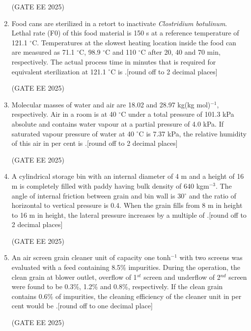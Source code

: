\documentclass[journal,12pt,onecolumn]{IEEEtran}
\theoremstyle{remark}
\begin{document}
\begin{enumerate}
\hfill(GATE EE 2025)

\item Food cans are sterilized in a retort to inactivate \textit{Clostridium botulinum}. Lethal rate (F$0$) of this food material is 150 s at a reference temperature of 121.1 $^\circ$C. Temperatures at the slowest heating location inside the food can are measured as 71.1 $^\circ$C, 98.9 $^\circ$C and 110 $^\circ$C after 20, 40 and 70 min, respectively. The actual process time in minutes that is required for equivalent sterilization at 121.1 $^\circ$C is \underline{\hspace{2cm}}.{[round off to 2 decimal places]}

\hfill(GATE EE 2025)

\item Molecular masses of water and air are 18.02 and 28.97 kg(kg mol)$^{-1}$, respectively. Air in a room is at 40 $^\circ$C under a total pressure of 101.3 kPa absolute and contains water vapour at a partial pressure of 4.0 kPa. If saturated vapour pressure of water at 40 $^\circ$C is 7.37 kPa, the relative humidity of this air in per cent is \underline{\hspace{2cm}}.{[round off to 2 decimal places]}

\hfill(GATE EE 2025)

\item A cylindrical storage bin with an internal diameter of 4 m and a height of 16 m is completely filled with paddy having bulk density of 640 kgm$^{-3}$. The angle of internal friction between grain and bin wall is 30$^\circ$ and the ratio of horizontal to vertical pressure is 0.4. When the grain fills from 8 m in height to 16 m in height, the lateral pressure increases by a multiple of \underline{\hspace{2cm}}.{[round off to 2 decimal places]}

\hfill(GATE EE 2025)

\item An air screen grain cleaner unit of capacity one tonh$^{-1}$ with two screens was evaluated with a feed containing 8.5\% impurities. During the operation, the clean grain at blower outlet, overflow of 1$^{st}$ screen and underflow of 2$^{nd}$ screen were found to be 0.3\%, 1.2\% and 0.8\%, respectively. If the clean grain contains 0.6\% of impurities, the cleaning efficiency of the cleaner unit in per cent would be \underline{\hspace{2cm}}.{[round off to one decimal place]}

\hfill(GATE EE 2025)


\end{enumerate}
\end{document}
